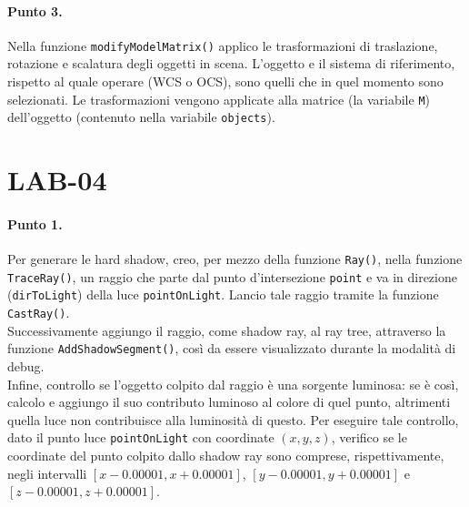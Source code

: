 \documentclass[a4paper, 12pt]{article}
\begin{document}
\paragraph{Punto 3.}
Nella funzione \texttt{modifyModelMatrix()} applico le trasformazioni di traslazione, rotazione e scalatura degli oggetti in scena. L'oggetto e il sistema di riferimento, rispetto al quale operare (WCS o OCS), sono quelli che in quel momento sono selezionati. Le trasformazioni vengono applicate alla matrice (la variabile \texttt{M}) dell'oggetto (contenuto nella variabile \texttt{objects}).


\section{LAB-04}

\paragraph{Punto 1.}
Per generare le hard shadow, creo, per mezzo della funzione \texttt{Ray()}, nella funzione \texttt{TraceRay()}, un raggio che parte dal punto d'intersezione \texttt{point} e va in direzione (\texttt{dirToLight}) della luce \texttt{pointOnLight}. Lancio tale raggio tramite la funzione \texttt{CastRay()}.\\
Successivamente aggiungo il raggio, come shadow ray, al ray tree, attraverso la funzione \texttt{AddShadowSegment()}, così da essere visualizzato durante la modalità di debug.\\
Infine, controllo se l'oggetto colpito dal raggio è una sorgente luminosa: se è così, calcolo e aggiungo il suo contributo luminoso al colore di quel punto, altrimenti quella luce non contribuisce alla luminosità di questo. Per eseguire tale controllo, dato il punto luce \texttt{pointOnLight} con coordinate $(x, y, z)$, verifico se le coordinate del punto colpito dallo shadow ray sono comprese, rispettivamente, negli intervalli $[x - 0.00001, x + 0.00001]$, $[y - 0.00001, y + 0.00001]$ e $[z - 0.00001, z + 0.00001]$.
\end{document}
